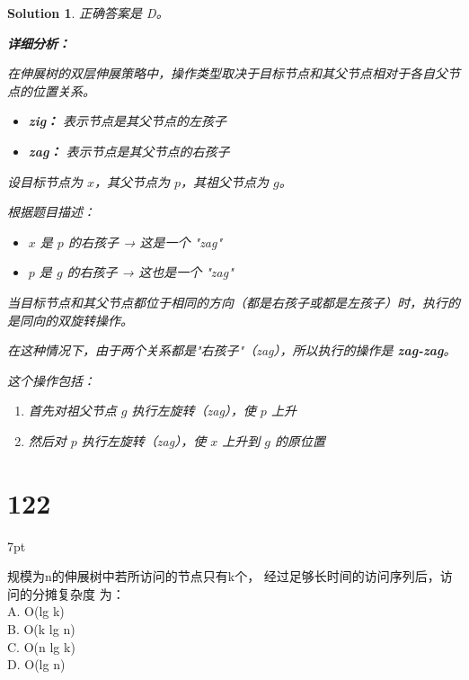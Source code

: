 \documentclass[UTF8]{report}
\newtheorem{solution}{Solution}
\theoremstyle{MyLineTheoremStyle} %
\theoremstyle{MyBlockTheoremStyle} %
\theoremstyle{MySubsubsectionStyle} %
\newenvironment{graybox}{%
        \def\FrameCommand{%
        \hspace{1pt}%
        {\color{gray}\small \vrule width 2pt}%
        {\color{graybox_color}\vrule width 4pt}%
        \colorbox{graybox_color}%
        }%
        \MakeFramed{\advance\hsize-\width\FrameRestore}%
        \noindent\hspace{-4.55pt}%
        \begin{adjustwidth}{}{7pt}%
        \vspace{2pt}\vspace{2pt}%
        }
        {%
        \vspace{2pt}\end{adjustwidth}\endMakeFramed%
        }
\begin{document}
\begin{solution}
正确答案是 D。

\textbf{详细分析：}

在伸展树的双层伸展策略中，操作类型取决于目标节点和其父节点相对于各自父节点的位置关系。

\begin{itemize}
    \item \textbf{zig：} 表示节点是其父节点的左孩子
    \item \textbf{zag：} 表示节点是其父节点的右孩子
\end{itemize}

设目标节点为 $x$，其父节点为 $p$，其祖父节点为 $g$。

根据题目描述：
\begin{itemize}
    \item $x$ 是 $p$ 的右孩子 → 这是一个 "zag"
    \item $p$ 是 $g$ 的右孩子 → 这也是一个 "zag"
\end{itemize}

当目标节点和其父节点都位于相同的方向（都是右孩子或都是左孩子）时，执行的是同向的双旋转操作。

在这种情况下，由于两个关系都是"右孩子"（zag），所以执行的操作是 \textbf{zag-zag}。

这个操作包括：
\begin{enumerate}
    \item 首先对祖父节点 $g$ 执行左旋转（zag），使 $p$ 上升
    \item 然后对 $p$ 执行左旋转（zag），使 $x$ 上升到 $g$ 的原位置
\end{enumerate}
\end{solution}


\section*{122}
\begin{graybox}
规模为n的伸展树中若所访问的节点只有k个，
经过足够长时间的访问序列后，访问的分摊复杂度
为：\\
A. O(lg k)\\
B. O(k lg n)\\
C. O(n lg k)\\
D. O(lg n)
\end{graybox}
\end{document}
